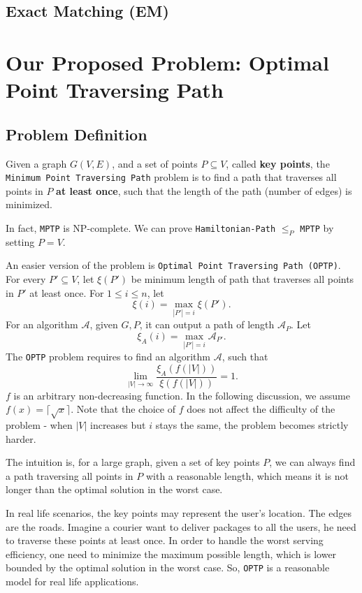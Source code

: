 \documentclass[11pt]{article}
\theoremstyle{plain}
\begin{document}
\subsection{Exact Matching (EM)}

\section{Our Proposed Problem: Optimal Point Traversing Path}

\subsection{Problem Definition}

Given a graph $G(V,E)$, and a set of points $P\subseteq V$, called \textbf{key points}, the \texttt{Minimum Point Traversing Path} problem is to find a path that traverses all points in $P$ \textbf{at least once}, such that the length of the path (number of edges) is minimized. 

In fact, \texttt{MPTP} is NP-complete. We can prove \texttt{Hamiltonian-Path} $\le_P$ \texttt{MPTP} by setting $P=V$.

An easier version of the problem is \texttt{Optimal Point Traversing Path (OPTP)}. For every $P'\subseteq V$, let $\xi(P')$ be minimum length of path that traverses all points in $P'$ at least once. For $1\le i\le n$, let
$$\xi(i) = \max\limits_{|P'|=i} \xi(P').$$
For an algorithm $\mathcal{A}$, given $G,P$, it can output a path of length $\mathcal{A}_P$. Let
$$\xi_A(i) = \max\limits_{|P'|=i} \mathcal{A}_{P'}.$$
The \texttt{OPTP} problem requires to find an algorithm $\mathcal{A}$, such that
$$\lim\limits_{|V|\to \infty} \dfrac{\xi_A(f(|V|))}{\xi(f(|V|))}=1.$$
$f$ is an arbitrary non-decreasing function. In the following discussion, we assume $f(x)=\lceil\sqrt{x}\rceil$. Note that the choice of $f$ does not affect the difficulty of the problem - when $|V|$ increases but $i$ stays the same, the problem becomes strictly harder.

The intuition is, for a large graph, given a set of key points $P$, we can always find a path traversing all points in $P$ with a reasonable length, which means it is not longer than the optimal solution in the worst case. 

In real life scenarios, the key points may represent the user's location. The edges are the roads. Imagine a courier want to deliver packages to all the users, he need to traverse these points at least once. In order to handle the worst serving efficiency, one need to minimize the maximum possible length, which is lower bounded by the optimal solution in the worst case. So, \texttt{OPTP} is a reasonable model for real life applications.
\end{document}
